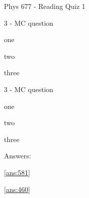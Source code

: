 \documentclass[letterpaper,10pt]{article}
\begin{document}
\begin{center}
{\Large Phys 677 - Reading Quiz 1}
\end{center}


\begin{compactenum}
    \begin{minipage}{\linewidth}
    \item 3 - MC question
    \begin{compactenum}
        \item \label{ans:581}one
        \item two
        \item three
    \end{compactenum}
    \end{minipage}

    \vspace{10pt}

    \begin{minipage}{\linewidth}
    \item 3 - MC question
    \begin{compactenum}
        \item one
        \item two
        \item \label{ans:460}three
    \end{compactenum}
    \end{minipage}

    \vspace{10pt}

\end{compactenum}

\clearpage
Answers:

  \ref{ans:581}

  \ref{ans:460}
\end{document}
